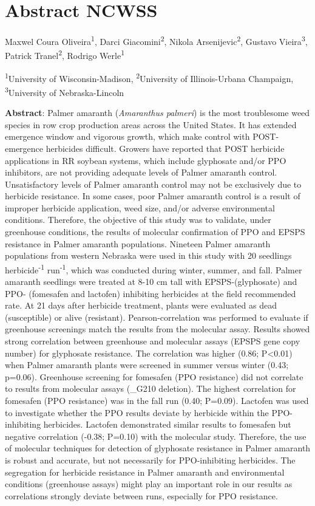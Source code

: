 \documentclass[]{article}
\begin{document}
\pagebreak

\section{\texorpdfstring{\textbf{Abstract
NCWSS}}{Abstract NCWSS}}\label{abstract-ncwss}

Maxwel Coura Oliveira\textsuperscript{1}, Darci
Giacomini\textsuperscript{2}, Nikola Arsenijevic\textsuperscript{2},
Gustavo Vieira\textsuperscript{3}, Patrick Tranel\textsuperscript{2},
Rodrigo Werle\textsuperscript{1}

\textsuperscript{1}University of Wisconsin-Madison,
\textsuperscript{2}University of Illinois-Urbana Champaign,
\textsuperscript{3}University of Nebraska-Lincoln

\textbf{Abstract}: Palmer amaranth (\emph{Amaranthus palmeri}) is the
most troublesome weed species in row crop production areas across the
United States. It has extended emergence window and vigorous growth,
which make control with POST-emergence herbicides difficult. Growers
have reported that POST herbicide applications in RR soybean systems,
which include glyphosate and/or PPO inhibitors, are not providing
adequate levels of Palmer amaranth control. Unsatisfactory levels of
Palmer amaranth control may not be exclusively due to herbicide
resistance. In some cases, poor Palmer amaranth control is a result of
improper herbicide application, weed size, and/or adverse environmental
conditions. Therefore, the objective of this study was to validate,
under greenhouse conditions, the results of molecular confirmation of
PPO and EPSPS resistance in Palmer amaranth populations. Nineteen Palmer
amaranth populations from western Nebraska were used in this study with
20 seedlings herbicide\textsuperscript{-1} run\textsuperscript{-1},
which was conducted during winter, summer, and fall. Palmer amaranth
seedlings were treated at 8-10 cm tall with EPSPS-(glyphosate) and PPO-
(fomesafen and lactofen) inhibiting herbicides at the field recommended
rate. At 21 days after herbicide treatment, plants were evaluated as
dead (susceptible) or alive (resistant). Pearson-correlation was
performed to evaluate if greenhouse screenings match the results from
the molecular assay. Results showed strong correlation between
greenhouse and molecular assays (EPSPS gene copy number) for glyphosate
resistance. The correlation was higher (0.86; P\textless{}0.01) when
Palmer amaranth plants were screened in summer versus winter (0.43;
p=0.06). Greenhouse screening for fomesafen (PPO resistance) did not
correlate to results from molecular assays (\_G210 deletion). The
highest correlation for fomesafen (PPO resistance) was in the fall run
(0.40; P=0.09). Lactofen was used to investigate whether the PPO results
deviate by herbicide within the PPO-inhibiting herbicides. Lactofen
demonstrated similar results to fomesafen but negative correlation
(-0.38; P=0.10) with the molecular study. Therefore, the use of
molecular techniques for detection of glyphosate resistance in Palmer
amaranth is robust and accurate, but not necessarily for PPO-inhibiting
herbicides. The segregation for herbicide resistance in Palmer amaranth
and environmental conditions (greenhouse assays) might play an important
role in our results as correlations strongly deviate between runs,
especially for PPO resistance.
\end{document}
